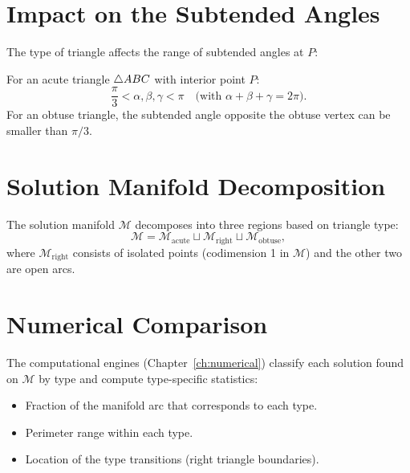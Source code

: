 \section{Impact on the Subtended Angles}

The type of triangle affects the range of subtended angles at $P$:
\begin{proposition}
For an acute triangle $\triangle ABC$ with interior point $P$:
\begin{equation}
\frac{\pi}{3} < \alpha, \beta, \gamma < \pi \quad \text{(with } \alpha + \beta + \gamma = 2\pi\text{)}.
\end{equation}
For an obtuse triangle, the subtended angle opposite the obtuse vertex can be smaller than $\pi/3$.
\end{proposition}

\section{Solution Manifold Decomposition}
The solution manifold $\mathcal{M}$ decomposes into three regions based on triangle type:
\begin{equation}
\mathcal{M} = \mathcal{M}_{\text{acute}} \sqcup \mathcal{M}_{\text{right}} \sqcup \mathcal{M}_{\text{obtuse}},
\end{equation}
where $\mathcal{M}_{\text{right}}$ consists of isolated points (codimension 1 in $\mathcal{M}$) and the other two are open arcs.

\section{Numerical Comparison}
The computational engines (Chapter~\ref{ch:numerical}) classify each solution found on $\mathcal{M}$ by type and compute type-specific statistics:
\begin{itemize}
    \item Fraction of the manifold arc that corresponds to each type.
    \item Perimeter range within each type.
    \item Location of the type transitions (right triangle boundaries).
\end{itemize}
